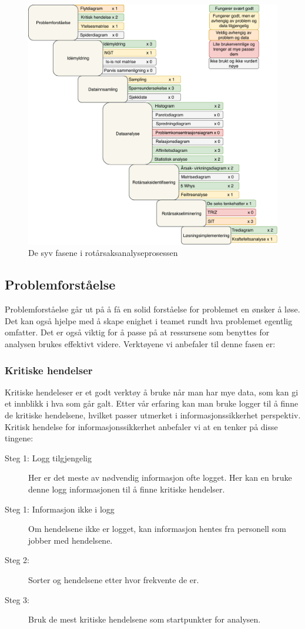\begin{figure}[H]
    \centering
    \includegraphics[scale=0.6]{main/bilder/RCA_Prosess_rettningslinjer.pdf}
    \caption[RCA-prosess]{De syv fasene i rotårsaksanalyseprosessen}
    \label{fig:prosess_veileder}
\end{figure}
\subsection{Problemforståelse}
Problemforståelse går ut på å få en solid forståelse for problemet en ønsker å løse. Det kan også hjelpe med å skape enighet i teamet rundt hva problemet egentlig omfatter. Det er også viktig for å passe på at ressursene som benyttes for analysen brukes effektivt videre. 
Verktøyene vi anbefaler til denne fasen er: 
\subsubsection{Kritiske hendelser} 
Kritiske hendeleser er et godt verktøy å bruke når man har mye data, som kan gi et innblikk i hva som går galt. Etter vår erfaring kan man bruke logger til å finne de kritiske hendelsene, hvilket passer utmerket i informasjonssikkerhet perspektiv. Kritisk hendelse for informasjonssikkerhet anbefaler vi at en tenker på disse tingene: 
\begin{description}
    \item [Steg 1: Logg tilgjengelig] Her er det meste av nødvendig informasjon ofte logget. Her kan en bruke denne logg informasjonen til å finne kritiske hendelser.
    \item [Steg 1: Informasjon ikke i logg] Om hendelsene ikke er logget, kan informasjon hentes fra personell som jobber med hendelsene.
    \item [Steg 2:] Sorter og hendelsene etter hvor frekvente de er.
    \item [Steg 3:] Bruk de mest kritiske hendelsene som startpunkter for analysen.
\end{description}


